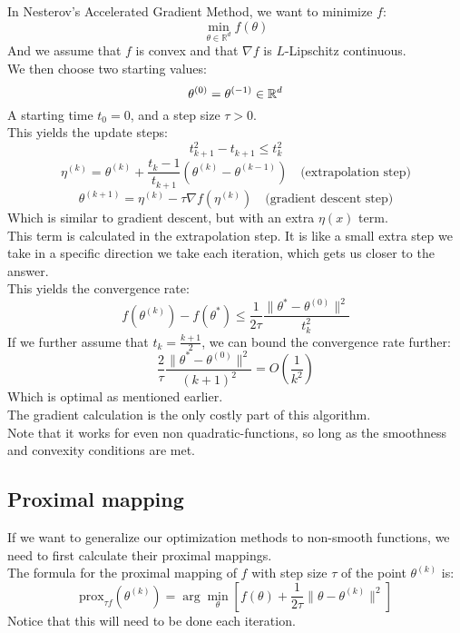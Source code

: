 \documentclass[12pt]{article}
\begin{document}
In Nesterov's Accelerated Gradient
Method, we want to minimize $f$:
\[ \min_{\theta \in \mathbb{R}^d} f(\theta) \]
And we assume that $f$
is convex and that $\nabla f$
is $L$-Lipschitz continuous. \\
We then choose two starting values:
\[ \theta^{(0)} = \theta^{(-1)} \in \mathbb{R}^d \]
A starting time $t_0 = 0$,
and a step size $\tau > 0$. \\
This yields the update steps:
\[ t_{k+1}^2 - t_{k+1} \leq t_k^2 \]
\[ \eta^{(k)} = \theta^{(k)} 
+ \frac{t_k - 1}{t_{k+1}} \left( \theta^{(k)} 
- \theta^{(k-1)} \right) \quad 
\text{(extrapolation step)} \]
\[ \theta^{(k+1)} = \eta^{(k)} - \tau \nabla 
f(\eta^{(k)}) \quad \text{(gradient 
descent step)} \]
Which is similar to gradient descent,
but with an extra $\eta(x)$ term. \\

This term is calculated in the extrapolation 
step. It is like a small extra step
we take in a specific direction
we take each iteration,
which gets us closer to the answer. \\

This yields the convergence rate:
\[ f(\theta^{(k)}) - f(\theta^*) \leq 
\frac{1}{2\tau} \frac{\|\theta^* - 
\theta^{(0)}\|^2}{t_k^2} \]
If we further assume that $t_k = \frac{k+1}{2}$,
we can bound the convergence rate further:
\[ \frac{2}{\tau} \frac{\|\theta^* - 
\theta^{(0)}\|^2}{(k+1)^2} = 
O\left(\frac{1}{k^2}\right) \]
Which is optimal as mentioned earlier. \\

The gradient calculation is the only costly 
part of this algorithm. \\

Note that it works for even non quadratic-functions,
so long as the smoothness and convexity
conditions are met. \\

\newpage

\subsection*{Proximal mapping}

If we want to generalize our optimization
methods to non-smooth functions, we need
to first calculate their proximal mappings. \\

The formula for the proximal mapping of $f$
with step size $\tau$ of the point $\theta^{(k)}$
is:
\[ \text{prox}_{\tau f}(\theta^{(k)}) 
= \arg\min_{\theta} \left[ f(\theta) 
+ \frac{1}{2\tau} \|\theta - \theta^{(k)}\|^2 
\right] \]
Notice that this will need to be done
each iteration. \\
\end{document}
